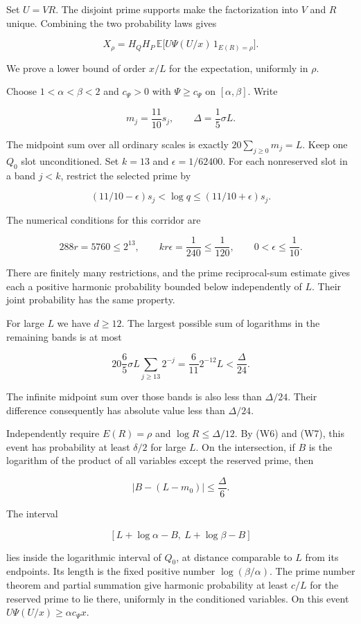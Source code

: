 Set \(U=VR\). The disjoint prime supports make the factorization into
\(V\) and \(R\) unique. Combining the two probability laws gives

\[
X_\rho=H_QH_P\,
 \mathbb E\big[U\Psi(U/x)\,1_{E(R)=\rho}\big]. \tag{W8}
\]

We prove a lower bound of order \(x/L\) for the expectation, uniformly
in \(\rho\).

Choose \(1<\alpha<\beta<2\) and \(c_\Psi>0\) with \(\Psi\ge c_\Psi\) on
\([\alpha,\beta]\). Write

\[
m_j=\frac{11}{10}s_j,\qquad
\Delta=\frac15\sigma L.
\]

The midpoint sum over all ordinary scales is exactly
\(20\sum_{j\ge0}m_j=L\). Keep one \(Q_0\) slot unconditioned. Set
\(k=13\) and \(\epsilon=1/62400\). For each nonreserved slot in a band
\(j<k\), restrict the selected prime by

\[
(11/10-\epsilon)s_j<\log q\le(11/10+\epsilon)s_j.
\]

The numerical conditions for this corridor are

\[
288r=5760\le2^{13},\qquad kr\epsilon=\frac1{240}\le\frac1{120},
\qquad0<\epsilon\le\frac1{10}.
\]

There are finitely many restrictions, and the prime reciprocal-sum
estimate gives each a positive harmonic probability bounded below
independently of \(L\). Their joint probability has the same property.

For large \(L\) we have \(d\ge12\). The largest possible sum of
logarithms in the remaining bands is at most

\[
20\frac65\sigma L\sum_{j\ge13}2^{-j}
 =\frac6{11}2^{-12}L<\frac\Delta{24}.
\]

The infinite midpoint sum over those bands is also less than
\(\Delta/24\). Their difference consequently has absolute value less
than \(\Delta/24\).

Independently require \(E(R)=\rho\) and \(\log R\le\Delta/12\). By (W6)
and (W7), this event has probability at least \(\delta/2\) for large
\(L\). On the intersection, if \(B\) is the logarithm of the product of
all variables except the reserved prime, then

\[
|B-(L-m_0)|\le\frac\Delta6.
\]

The interval

\[
[L+\log\alpha-B,\ L+\log\beta-B]
\]

lies inside the logarithmic interval of \(Q_0\), at distance comparable
to \(L\) from its endpoints. Its length is the fixed positive number
\(\log(\beta/\alpha)\). The prime number theorem and partial summation
give harmonic probability at least \(c/L\) for the reserved prime to lie
there, uniformly in the conditioned variables. On this event
\(U\Psi(U/x)\ge\alpha c_\Psi x\).

